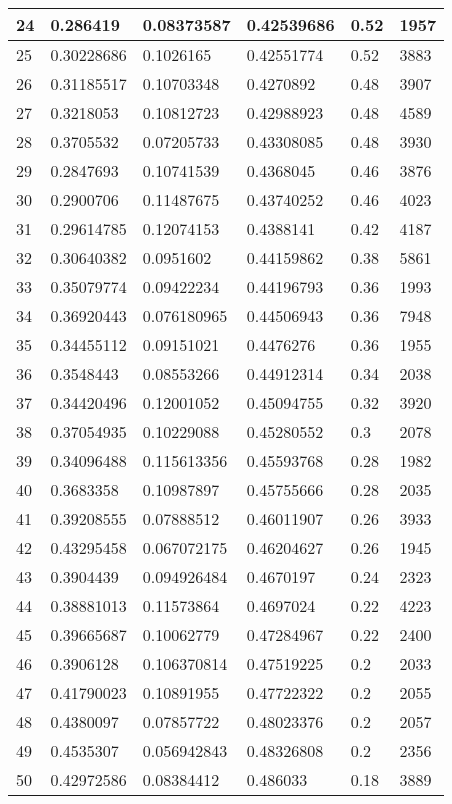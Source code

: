 \begin{longtable}{|l|l|l|l|l|l|}
24 & 0.286419 & 0.08373587 & 0.42539686 & 0.52 & 1957 \\ \hline 
25 & 0.30228686 & 0.1026165 & 0.42551774 & 0.52 & 3883 \\ \hline 
26 & 0.31185517 & 0.10703348 & 0.4270892 & 0.48 & 3907 \\ \hline 
27 & 0.3218053 & 0.10812723 & 0.42988923 & 0.48 & 4589 \\ \hline 
28 & 0.3705532 & 0.07205733 & 0.43308085 & 0.48 & 3930 \\ \hline 
29 & 0.2847693 & 0.10741539 & 0.4368045 & 0.46 & 3876 \\ \hline 
30 & 0.2900706 & 0.11487675 & 0.43740252 & 0.46 & 4023 \\ \hline 
31 & 0.29614785 & 0.12074153 & 0.4388141 & 0.42 & 4187 \\ \hline 
32 & 0.30640382 & 0.0951602 & 0.44159862 & 0.38 & 5861 \\ \hline 
33 & 0.35079774 & 0.09422234 & 0.44196793 & 0.36 & 1993 \\ \hline 
34 & 0.36920443 & 0.076180965 & 0.44506943 & 0.36 & 7948 \\ \hline 
35 & 0.34455112 & 0.09151021 & 0.4476276 & 0.36 & 1955 \\ \hline 
36 & 0.3548443 & 0.08553266 & 0.44912314 & 0.34 & 2038 \\ \hline 
37 & 0.34420496 & 0.12001052 & 0.45094755 & 0.32 & 3920 \\ \hline 
38 & 0.37054935 & 0.10229088 & 0.45280552 & 0.3 & 2078 \\ \hline 
39 & 0.34096488 & 0.115613356 & 0.45593768 & 0.28 & 1982 \\ \hline 
40 & 0.3683358 & 0.10987897 & 0.45755666 & 0.28 & 2035 \\ \hline 
41 & 0.39208555 & 0.07888512 & 0.46011907 & 0.26 & 3933 \\ \hline 
42 & 0.43295458 & 0.067072175 & 0.46204627 & 0.26 & 1945 \\ \hline 
43 & 0.3904439 & 0.094926484 & 0.4670197 & 0.24 & 2323 \\ \hline 
44 & 0.38881013 & 0.11573864 & 0.4697024 & 0.22 & 4223 \\ \hline 
45 & 0.39665687 & 0.10062779 & 0.47284967 & 0.22 & 2400 \\ \hline 
46 & 0.3906128 & 0.106370814 & 0.47519225 & 0.2 & 2033 \\ \hline 
47 & 0.41790023 & 0.10891955 & 0.47722322 & 0.2 & 2055 \\ \hline 
48 & 0.4380097 & 0.07857722 & 0.48023376 & 0.2 & 2057 \\ \hline 
49 & 0.4535307 & 0.056942843 & 0.48326808 & 0.2 & 2356 \\ \hline 
50 & 0.42972586 & 0.08384412 & 0.486033 & 0.18 & 3889 \\ \hline 
\end{longtable}